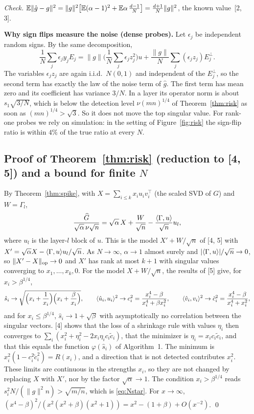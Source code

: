 \emph{Check.} $\mathbb{E}\|\hat g-g\|^2=\|g\|^2\big[\mathbb{E}(\alpha-1)^2+\mathbb{E}\alpha\,\frac{d-1}{N}\big]=\frac{d+1}{N}\|g\|^2$, the known value~[2, 3].

\textbf{Why sign flips measure the noise (dense probes).} Let $\epsilon_j$ be independent random signs. By the same decomposition,
\[
\frac1N\sum_j\epsilon_jy_jE_j=\|g\|\Big(\frac1N\sum_j\epsilon_jz_j^2\Big)u+\frac{\|g\|}{N}\sum_j(\epsilon_jz_j)E_j^\perp .
\]
The variables $\epsilon_jz_j$ are again i.i.d.\ $N(0,1)$ and independent of the $E_j^\perp$, so the second term has exactly the law of the noise term of $\hat g$. The first term has mean zero and its coefficient has variance $3/N$. In a layer its operator norm is about $s_1\sqrt{3/N}$, which is below the detection level $\nu(mn)^{1/4}$ of Theorem~\ref{thm:risk} as soon as $(mn)^{1/4}>\sqrt3$. So it does not move the top singular value. For rank-one probes we rely on simulation: in the setting of Figure~\ref{fig:risk} the sign-flip ratio is within $4\%$ of the true ratio at every $N$.

\subsection{Proof of Theorem~\ref{thm:risk} (reduction to [4, 5]) and a bound for finite $N$}
By Theorem~\ref{thm:spike}, with $X=\sum_{i\le k}x_iu_iv_i^\top$ (the scaled SVD of $G$) and $W=\Gamma_l$,
\[
\frac{\widehat G}{\sqrt\alpha\,\nu\sqrt n}=\sqrt\alpha\,X+\frac{W}{\sqrt n}-\frac{\langle \Gamma,u\rangle}{\sqrt n}u_l ,
\]
where $u_l$ is the layer-$l$ block of $u$. This is the model $X'+W/\sqrt n$ of [4, 5] with $X'=\sqrt\alpha X-\langle \Gamma,u\rangle u_l/\sqrt n$. As $N\to\infty$, $\alpha\to1$ almost surely and $|\langle \Gamma,u\rangle|/\sqrt n\to0$, so $\|X'-X\|_{\mathrm{op}}\to0$ and $X'$ has rank at most $k+1$ with singular values converging to $x_1,\dots,x_k,0$. For the model $X+W/\sqrt n$, the results of [5] give, for $x_i>\beta^{1/4}$,
\[
\hat s_i\to\sqrt{\Big(x_i+\frac1{x_i}\Big)\Big(x_i+\frac\beta{x_i}\Big)},\qquad
\langle \hat u_i,u_i\rangle^2\to c_i^2=\frac{x_i^4-\beta}{x_i^4+\beta x_i^2},\qquad
\langle \hat v_i,v_i\rangle^2\to\tilde c_i^2=\frac{x_i^4-\beta}{x_i^4+x_i^2},
\]
and for $x_i\le\beta^{1/4}$, $\hat s_i\to1+\sqrt\beta$ with asymptotically no correlation between the singular vectors. [4] shows that the loss of a shrinkage rule with values $\eta_i$ then converges to $\sum_i(x_i^2+\eta_i^2-2x_i\eta_ic_i\tilde c_i)$, that the minimizer is $\eta_i=x_ic_i\tilde c_i$, and that this equals the function $\varphi(\hat s_i)$ of Algorithm~1. The minimum is $x_i^2(1-c_i^2\tilde c_i^2)=R(x_i)$, and a direction that is not detected contributes $x_i^2$. These limits are continuous in the strengths $x_i$, so they are not changed by replacing $X$ with $X'$, nor by the factor $\sqrt\alpha\to1$. The condition $x_i>\beta^{1/4}$ reads $s_i^2N/(\|g\|^2n)>\sqrt{m/n}$, which is \eqref{eq:Nstar}. For $x\to\infty$, $(x^4-\beta)^2/(x^2(x^2+\beta)(x^2+1))=x^2-(1+\beta)+O(x^{-2})$. \qed

